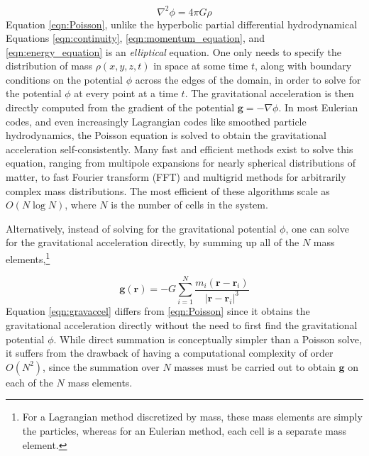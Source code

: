 \documentclass[notoc]{tufte-handout}
\renewcommand{\vec}[1]{
\mathbf{#1}
}
\begin{document}
\begin {equation}
\boxed {\nabla^2 \phi = 4 \pi G \rho}
\label {eqn:Poisson}
\end {equation}
%
Equation \ref {eqn:Poisson}, unlike the hyperbolic partial differential hydrodynamical Equations \ref {eqn:continuity}, \ref {eqn:momentum_equation}, and \ref {eqn:energy_equation} is an {\it elliptical} equation. One only needs to specify the distribution of mass $\rho (x, y, z, t)$ in space at some time $t$, along with boundary conditions on the potential $\phi$ across the edges of the domain, in order to solve for the potential $\phi$ at every point at a time $t$.  The gravitational acceleration is then directly computed from the gradient of the potential $\vec {g} = - \nabla \phi$. In most Eulerian codes, and even increasingly Lagrangian codes like smoothed particle hydrodynamics, the Poisson equation is solved to obtain the gravitational acceleration self-consistently.  Many fast and efficient methods exist to solve this equation, ranging from multipole expansions for nearly spherical distributions of matter, to fast Fourier transform (FFT) and multigrid methods for arbitrarily complex mass distributions.  The most efficient of these algorithms scale as $O(N \log N)$, where $N$ is the number of cells in the system. 

Alternatively, instead of solving for the gravitational potential $\phi$, one can solve for the gravitational acceleration directly, by summing up all of the $N$ mass elements,\footnote {For a Lagrangian method discretized by mass, these mass elements are simply the particles, whereas for an Eulerian method, each cell is a separate mass element.}

\begin {equation}
\vec{g}(\vec{r}) = -G \sum_{i=1}^{N} \frac{m_i (\vec{r} - \vec{r}_i)}{|\vec{r} - \vec{r}_i|^3}
\label {eqn:gravaccel}
\end {equation}
%
Equation \ref {eqn:gravaccel} differs from \ref {eqn:Poisson} since it obtains the gravitational acceleration directly without the need to first find the gravitational potential $\phi$. While direct summation is conceptually simpler than a Poisson solve, it suffers from the drawback of having a computational complexity of order $O(N^2)$, since the summation over $N$ masses must be carried out to obtain $\vec {g}$ on each of the $N$ mass elements. 
\end{document}
